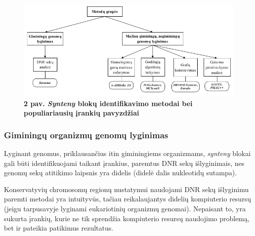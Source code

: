 \documentclass[12pt]{article}
\begin{document}
\begin{figure}[htb]
    \begin{center}
        \includegraphics[width=0.9\linewidth]{../Figures/Methods_tools.png}
        \vspace{-2\baselineskip}
        \caption*{\small\textbf{2 pav. \emph{Synteny} blokų identifikavimo
        metodai bei populiariausių įrankių pavyzdžiai}}
        \label{fig:birds}
    \end{center}
\end{figure}

\newpage

\subsubsection{Giminingų organizmų genomų lyginimas}
Lyginant genomus, priklausančius itin giminingiems organizmams, \emph{synteny}
blokai gali būti identifikuojami taikant įrankius, paremtus DNR sekų
išlyginimais, nes genomų sekų atitikimo laipsnis yra didelis (didelė dalis
nukleotidų sutampa).

Konservatyvių chromosomų regionų nustatymui naudojami DNR sekų išlyginimu
paremti metodai yra intuityvūs, tačiau reikalaujantys didelių kompiuterio
resursų (jeigu tarpusavyje lyginami eukariotinių organizmų genomai).
Nepaisant to, yra sukurta įrankių, kurie ne tik sprendžia kompiuterio resursų
naudojimo problemą, bet ir pateikia patikimus rezultatus.
\end{document}
